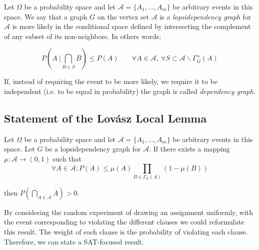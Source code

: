 \begin{definition} Let $\Omega$ be a probability space and let 
$\mathcal{A} = \{A_1,...,A_m\}$ be arbitrary events in this space. We say that a graph $G$ on the vertex set $\mathcal{A}$ is a \emph{lopsidependency graph }for $\mathcal{A}$ is more likely in the conditional space defined by intersecting the complement of any subset of its non-neighbors. In others words:

\[
 P\left(  A\ \Big | \bigcap_{B\in S} \overline{B} \right ) \le P(A) \ \ \ \ \quad \forall A \in \mathcal{A},\ \forall S \subset \mathcal{A} \backslash\Gamma_G^+(A) 
\]


If, instead of requiring the event to be more likely, we require it to be independent (i.e. to be equal in probability) the graph is called \emph{dependency graph}.

\end{definition}

\subsection{Statement of the Lovász Local Lemma}

\begin{theorem}\label{LLL}
	Let $\Omega$ be a probability space and let 
$\mathcal{A} = \{A_1,...,A_m\}$ be arbitrary events in this space. Let $G$ be a lopsidependency graph for $\mathcal{A}$. If there exists a mapping $\mu:\mathcal{A} \to (0,1)$ such that 
$$
\forall A \in \mathcal{A} : P (A) \le \mu(A) \prod_{B\in\Gamma_G(A)} (1-\mu(B))
$$

then $P\left ( \bigcap_{A\in \mathcal{A}} \overline{A}\right ) > 0$.\\
\end{theorem}

By considering the random experiment of drawing an assignment uniformly, with the event corresponding to violating the different clauses we could reformulate this result. The weight of each clause is the probability of violating each clause. Therefore, we can state a SAT-focused result.

